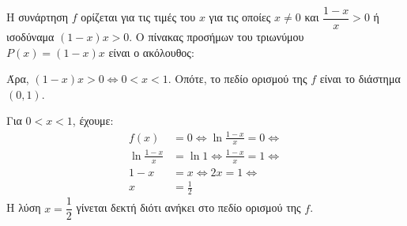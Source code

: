 \begin{alist}
\item Η συνάρτηση $f$ ορίζεται για τις τιμές του $x$ για τις οποίες $x \ne 0$ και $\dfrac{1-x}{x} > 0$ ή ισοδύναμα $(1-x)x > 0$. Ο πίνακας προσήμων του τριωνύμου $P(x) = (1-x)x$ είναι ο ακόλουθος:
\begin{center}
\end{center}
Άρα, $(1-x)x > 0 \Leftrightarrow 0 < x < 1$. Οπότε, το πεδίο ορισμού της $f$ είναι το διάστημα $(0, 1)$.
\item Για $0 < x < 1$, έχουμε:
\begin{align*}
f(x) &= 0 \Leftrightarrow \ln\frac{1-x}{x} = 0 \Leftrightarrow \\
\ln\frac{1-x}{x} &= \ln 1 \Leftrightarrow \frac{1-x}{x} = 1 \Leftrightarrow \\
1 - x &= x \Leftrightarrow 2x = 1 \Leftrightarrow \\
x &= \frac{1}{2}
\end{align*}
Η λύση $x = \dfrac{1}{2}$ γίνεται δεκτή διότι ανήκει στο πεδίο ορισμού της $f$.
\end{alist}

